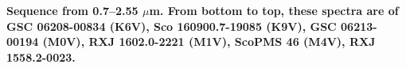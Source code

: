 {\bf Sequence from 0.7–2.55 $\mu$m. From bottom to top, these spectra are of GSC 06208-00834 (K6V), Sco 160900.7-19085 (K9V), GSC 06213-00194 (M0V), RXJ 1602.0-2221 (M1V), ScoPMS 46 (M4V), RXJ 1558.2-0023. \label{fig:stack-plot-e}}
